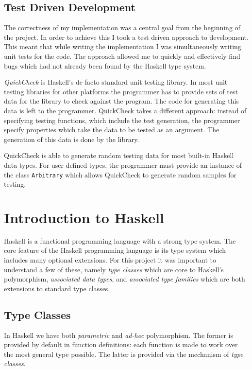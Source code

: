 \documentclass[12pt,a4paper,oneside]{scrbook}
\begin{document}
\subsection{Test Driven Development}
\label{sec:tdd}

The correctness of my implementation was a central goal from the beginning of
the project. In order to achieve this I took a test driven approach to
development. This meant that while writing the implementation I was
simultaneously writing unit tests for the code.  The approach allowed me to
quickly and effectively find bugs which had not already been found by the
Haskell type system.

\emph{QuickCheck} is Haskell's de facto standard unit testing library. In most
unit testing libraries for other platforms the programmer has to provide sets of
test data for the library to check against the program.  The code for generating
this data is left to the programmer. QuickCheck takes a different approach:
instead of specifying testing functions, which include the test generation, the
programmer specify properties which take the data to be tested as an
argument. The generation of this data is done by the library.

QuickCheck is able to generate random testing data for most built-in Haskell
data types. For user defined types, the programmer must provide an instance of
the class \texttt{Arbitrary} which allows QuickCheck to generate random samples
for testing.

\section{Introduction to Haskell}
\label{sec:haskell}

Haskell is a functional programming language with a strong type system. The core
feature of the Haskell programming language is its type system which includes
many optional extensions. For this project it was important to understand a few
of these, namely \emph{type classes} which are core to Haskell's polymorphism,
\emph{associated data types}, and \emph{associated type families} which are both
extensions to standard type classes.

\subsection{Type Classes}
\label{sec:typeclasses}

In Haskell we have both \emph{parametric} and \emph{ad-hoc} polymorphism. The
former is provided by default in function definitions: each function is made to
work over the most general type possible. The latter is provided via the
mechanism of \emph{type classes}.
\end{document}
